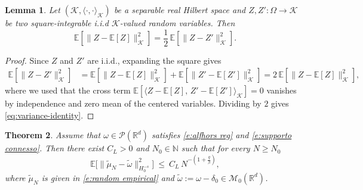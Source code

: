 \documentclass[12pt,a4paper,oneside]{amsart}
\theoremstyle{plain}
\newtheorem{theorem}{Theorem}[section]
\newtheorem{lemma}[theorem]{Lemma}
\theoremstyle{definition}
\numberwithin{equation}{section}
\numberwithin{figure}{section}
\numberwithin{table}{section}
\theoremstyle{remark}
\newcommand{\R}{\mathbb{R}}
\newcommand{\calM}{\mathcal{M}}
\newcommand{\N}{\mathbb{N}}
\newcommand{\expAhlfors}{\beta}
\begin{document}
\begin{lemma}\label{l:hilbert-variance}
Let $(\mathcal{K},\langle\cdot,\cdot\rangle_{\mathcal{K}})$ be a separable real Hilbert space and $Z,Z':\Omega \to \mathcal{K}$ be two square-integrable i.i.d $\mathcal{K}$-valued random variables. Then
\begin{equation}\label{eq:variance-identity}
\mathbb{E}[\|Z-\mathbb{E}[Z]\|_{\mathcal{K}}^2]=\frac12\,\mathbb{E}[\|Z-Z'\|_{\mathcal{K}}^2].
\end{equation}
\end{lemma}
% 
\begin{proof}
Since $Z$ and $Z'$ are i.i.d., expanding the square gives
\begin{align*}
\mathbb{E}[\|Z-Z'\|_{\mathcal{K}}^2]
&= \mathbb{E}[\|Z-\mathbb{E}[Z]\|_{\mathcal{K}}^2]
 + \mathbb{E}[\|Z'-\mathbb{E}[Z']\|_{\mathcal{K}}^2]
= 2\,\mathbb{E}[\|Z-\mathbb{E}[Z]\|_{\mathcal{K}}^2],
\end{align*}
where we used that the cross term
$\mathbb{E}[\langle Z - \mathbb{E}[Z],\, Z' - \mathbb{E}[Z']\rangle_{\mathcal{K}}] = 0$
vanishes by independence and zero mean of the centered variables.
Dividing by $2$ gives \eqref{eq:variance-identity}.
\end{proof}




\begin{theorem}\label{t:upper bound in media}
Assume that $\omega\in \mathcal{P}(\R^d)$ satisfies \eqref{e:alfhors reg} and \eqref{e:supporto connesso}. Then there exist $C_L>0$ and $N_0\in \N$ such that for every $N\geq N_0$ 
\begin{equation}\label{e:mean-upper-bound}
\mathbb{E}\bigl[\|\tilde{\mu}_N-\tilde{\omega}\|_{H_0^{-s}}^2\bigr]\ \le\ C_L\,N^{-(1+\frac{q}{\expAhlfors})},
\end{equation}
where $\tilde{\mu}_N$ is given in \eqref{e:random empirical} and $\tilde{\omega}:=\omega-\delta_0\in \calM_0(\R^d)$.
\end{theorem}
\end{document}
